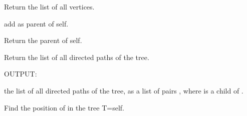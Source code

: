 \documentclass[letterpaper,10pt,english]{sphinxmanual}
\begin{document}
\begin{fulllineitems}
\begin{fulllineitems}
\end{fulllineitems}


\begin{fulllineitems}
\label{berkovich_trees:mclf.berkovich.berkovich_trees.BerkovichTree.leaves}
Return the list of all vertices.

\end{fulllineitems}


\begin{fulllineitems}
\label{berkovich_trees:mclf.berkovich.berkovich_trees.BerkovichTree.make_parent}
add  as parent of self.

\end{fulllineitems}


\begin{fulllineitems}
\label{berkovich_trees:mclf.berkovich.berkovich_trees.BerkovichTree.parent}
Return the parent of self.

\end{fulllineitems}


\begin{fulllineitems}
\label{berkovich_trees:mclf.berkovich.berkovich_trees.BerkovichTree.paths}
Return the list of all directed paths of the tree.

OUTPUT:

the list of all directed paths of the tree, as a list of pairs 
, where  is a child of .

\end{fulllineitems}


\begin{fulllineitems}
\label{berkovich_trees:mclf.berkovich.berkovich_trees.BerkovichTree.position}
Find the position of  in the tree T=self.


\end{fulllineitems}
\end{fulllineitems}
\end{document}
